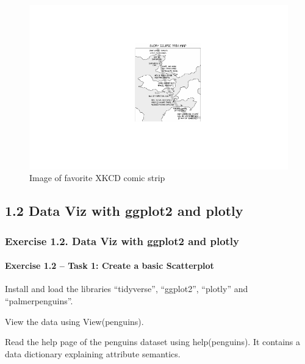 \documentclass[
  letterpaper,
  DIV=11,
  numbers=noendperiod]{scrartcl}
\let\oldparagraph\paragraph
\renewcommand{\paragraph}[1]{\oldparagraph{#1}\mbox{}}
\begin{document}
\begin{enumerate}
\begin{figure}[H]
  {\centering \includegraphics{Part1_Lecture1_Ex_files/figure-pdf/fig-fav-comic-strip-1.pdf}

  }

  \caption{\label{fig-fav-comic-strip}Image of favorite XKCD comic
  strip}

  \end{figure}
\end{enumerate}

\hypertarget{data-viz-with-ggplot2-and-plotly}{%
\subsection{1.2 Data Viz with ggplot2 and
plotly}\label{data-viz-with-ggplot2-and-plotly}}

\hypertarget{exercise-1.2.-data-viz-with-ggplot2-and-plotly}{%
\subsubsection{Exercise 1.2. Data Viz with ggplot2 and
plotly}\label{exercise-1.2.-data-viz-with-ggplot2-and-plotly}}

\hypertarget{exercise-1.2-task-1-create-a-basic-scatterplot}{%
\paragraph{Exercise 1.2 -- Task 1: Create a basic
Scatterplot}\label{exercise-1.2-task-1-create-a-basic-scatterplot}}

Install and load the libraries ``tidyverse'', ``ggplot2'', ``plotly''
and ``palmerpenguins''.

View the data using View(penguins).

Read the help page of the penguins dataset using help(penguins). It
contains a data dictionary explaining attribute semantics.
\end{document}
